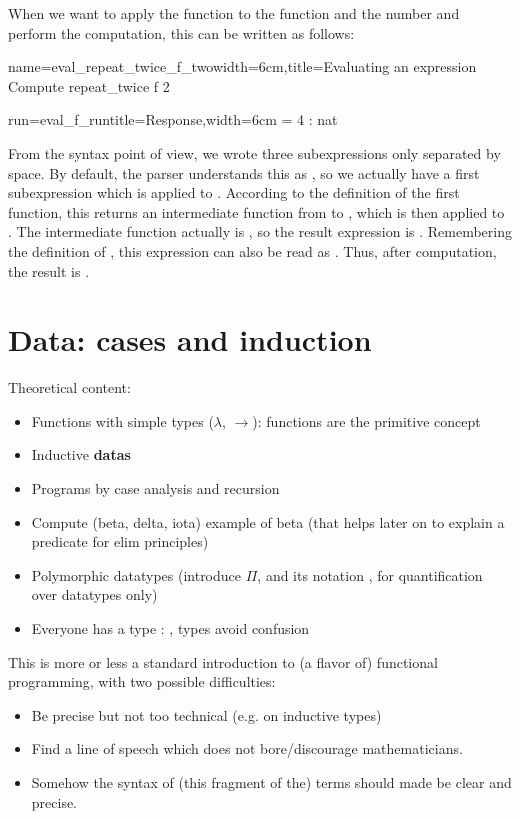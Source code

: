 When we want to apply the function  to the function
 and the number  and perform the computation, this can be
written as follows:
\begin{coq}{name=eval_repeat_twice_f_two}{width=6cm,title=Evaluating
    an expression}
Compute repeat_twice f 2
\end{coq}
\begin{coqout}{run=eval_f_run}{title=Response,width=6cm}
  = 4 : nat
\end{coqout}
From the syntax point of view, we wrote three subexpressions only
separated by space.  By default, the parser understands this as
, so we actually have a first subexpression
which is  applied to .  According to the
definition of the first function, this returns an intermediate
function from 
to , which is then applied to .  The intermediate function
actually is , so the result expression is .  Remembering the definition of , this expression can also
be read as .  Thus, after computation, the result is .

\section{Data: cases and induction}

Theoretical content:
\begin{itemize}
\item Functions with simple types ($\lambda$, $\rightarrow$): functions are the primitive concept
\item Inductive {\bf datas}
\item Programs by case analysis and recursion
\item Compute (beta, delta, iota) example of beta (that helps later on to explain a predicate for elim principles)
\item Polymorphic datatypes (introduce $\Pi$, and its \Coq{} notation
  , for quantification over datatypes only)
\item Everyone has a type : , types avoid confusion
\end{itemize}
This is more or less a standard introduction to (a flavor of)
functional programming, with two possible difficulties:
\begin{itemize}
\item Be precise but not too technical (e.g. on inductive types)
\item Find a line of speech which does not bore/discourage
  mathematicians.
\item Somehow the syntax of (this fragment of the) terms should made
  be clear and precise.
\end{itemize}


